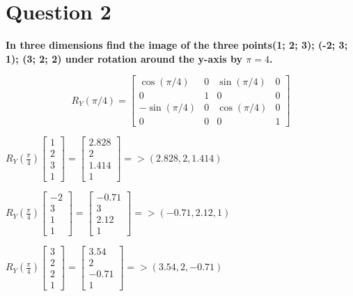 \documentclass{article}
\begin{document}
\section{Question 2}
\textbf{In three dimensions find the image of the three points(1; 2; 3); (-2; 3; 1); (3; 2; 2) under rotation around the y-axis by $\pi=4$.} 

\begin{center}
    \begin{equation}
R_Y(\pi / 4)=\left[\begin{array}{rrrr}
\cos (\pi / 4) & 0 & \sin (\pi / 4) & 0 \\
0 & 1 & 0 & 0 \\
-\sin (\pi / 4) & 0 & \cos (\pi / 4) & 0 \\
0 & 0 & 0 & 1
\end{array}\right]
\end{equation}
    \item $R_Y(\frac{\pi}{4})\begin{bmatrix}
    1 \\ 2\\3\\1
    \end{bmatrix} = \begin{bmatrix}
    2.828 \\ 2\\ 1.414\\1
    \end{bmatrix} =>(2.828,2,1.414)$
    \item $R_Y(\frac{\pi}{4})\begin{bmatrix}
    -2\\ 3\\1\\1
    \end{bmatrix} = \begin{bmatrix}
    -0.71 \\ 3\\2.12\\1
    \end{bmatrix} =>(-0.71,2.12,1)$
    \item $R_Y(\frac{\pi}{4})\begin{bmatrix}
    3\\ 2\\2\\1
    \end{bmatrix} = \begin{bmatrix}
    3.54\\ 2\\-0.71\\1
    \end{bmatrix} =>(3.54,2,-0.71)$
\end{center}
\end{document}
